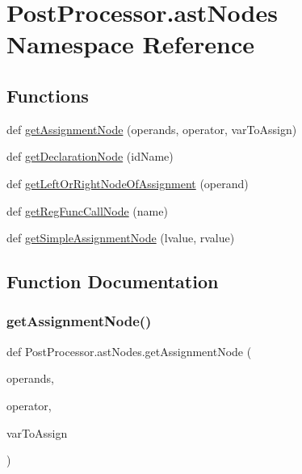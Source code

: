 \hypertarget{namespacePostProcessor_1_1astNodes}{}\section{Post\+Processor.\+ast\+Nodes Namespace Reference}
\label{namespacePostProcessor_1_1astNodes}
\subsection*{Functions}
\begin{DoxyCompactItemize}
\item 
def \hyperlink{namespacePostProcessor_1_1astNodes_aa6c634c9a1dceb3e9cc65cadadf5f450}{get\+Assignment\+Node} (operands, operator, var\+To\+Assign)
\item 
def \hyperlink{namespacePostProcessor_1_1astNodes_aebd6602b5bdafed24833f298500fd85c}{get\+Declaration\+Node} (id\+Name)
\item 
def \hyperlink{namespacePostProcessor_1_1astNodes_afb1489449acb633bf78b48165fe578be}{get\+Left\+Or\+Right\+Node\+Of\+Assignment} (operand)
\item 
def \hyperlink{namespacePostProcessor_1_1astNodes_a30de65f8e1753733f88a01d42927ef1b}{get\+Reg\+Func\+Call\+Node} (name)
\item 
def \hyperlink{namespacePostProcessor_1_1astNodes_a1fc39a0ad420aefababe0a8ee2907f4e}{get\+Simple\+Assignment\+Node} (lvalue, rvalue)
\end{DoxyCompactItemize}


\subsection{Function Documentation}
\mbox{\label{namespacePostProcessor_1_1astNodes_aa6c634c9a1dceb3e9cc65cadadf5f450}} 
\subsubsection{\texorpdfstring{get\+Assignment\+Node()}{getAssignmentNode()}}
{\footnotesize\ttfamily def Post\+Processor.\+ast\+Nodes.\+get\+Assignment\+Node (\begin{DoxyParamCaption}\item[{}]{operands,  }\item[{}]{operator,  }\item[{}]{var\+To\+Assign }\end{DoxyParamCaption})}

